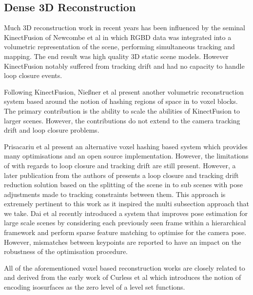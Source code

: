 \subsection{Dense 3D Reconstruction}
Much 3D reconstruction work in recent years has been influenced by the seminal KinectFusion\cite{Newcombe2011} of Newcombe et al in which
RGBD data was integrated into a volumetric representation of the scene, performing simultaneous tracking and mapping. The end result was
high quality 3D static scene models. 
However KinectFusion notably suffered from tracking drift and had no capacity to handle loop closure
events.

Following KinectFusion, Nie{\ss}ner et al present another volumetric reconstruction system\cite{Niessner2013} based around the notion of
hashing regions of space in to voxel blocks.  The primary contribution is the ability to scale the abilities of KinectFusion to larger
scenes. However, the contributions do not extend to the camera tracking drift and loop closure problems.

Prisacariu et al present an alternative voxel hashing based system\cite{Prisacariu2014} which provides many optimisations and an open source 
implementation. However, the limitations of\cite{Newcombe2011,Niessner2013} with regards to loop closure and tracking drift are still present. 
However, a later publication\cite{Kahler2016} from the authors of\cite{Prisacariu2014} presents a loop closure and tracking drift reduction 
solution based on the splitting of the scene in to sub scenes with pose adjustments made to tracking constraints between them. This approach 
is extremely pertinent to this work as it inspired the multi subsection approach that we take.
Dai et al recently introduced a system that improves pose estimation for large scale scenes by considering each previously seen frame within a 
hierarchical framework and perform sparse feature matching to optimise for the camera pose. However, mismatches between keypoints are reported 
to have an impact on the robustness of the optimisation procedure.

All of the aforementioned voxel based reconstruction works are closely related to and derived from the early work of Curless et al \cite{Curless1996} 
which introduces the notion of encoding isosurfaces as the zero level of a level set functions.


